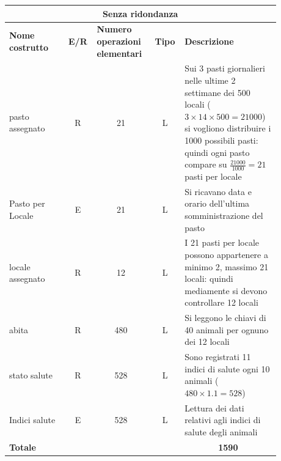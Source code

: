 \documentclass[12pt,a4paper]{article}
\begin{document}
\begin{center}\setlength{\extrarowheight}{1.5pt}\begin{longtable}{|p{0.2\linewidth}|p{0.1\linewidth}|p{0.175\linewidth}|p{0.1\linewidth}|p{0.3\linewidth}|}
\hline
\multicolumn{5}{|c|}{Senza ridondanza}
\\
\hline \textbf{Nome costrutto}   & \multicolumn{1}{|c|}{\textbf{E/R}} & \textbf{Numero operazioni elementari} & \multicolumn{1}{|c|}{\textbf{Tipo}} & \textbf{Descrizione}\\ 
\hline
pasto assegnato
 & 
\multicolumn{1}{|c|}{R}
 & 
\multicolumn{1}{|c|}{21}
 & 
\multicolumn{1}{|c|}{L}
 & 
Sui 3 pasti giornalieri nelle ultime 2 settimane dei 500 locali ($3\times 14 \times 500= 21000$) si vogliono distribuire i 1000 possibili pasti: quindi ogni pasto compare su $\frac{21000}{1000}=21$ pasti per locale
\\
\hline
Pasto per Locale
 & 
\multicolumn{1}{|c|}{E}
 & 
\multicolumn{1}{|c|}{21}
 & 
\multicolumn{1}{|c|}{L}
 & 
Si ricavano data e orario dell'ultima somministrazione del pasto
\\
\hline
locale assegnato
 & 
\multicolumn{1}{|c|}{R}
 & 
\multicolumn{1}{|c|}{12}
 & 
\multicolumn{1}{|c|}{L}
 & 
I 21 pasti per locale possono appartenere a minimo 2, massimo 21 locali: quindi mediamente si devono controllare 12 locali
\\
\hline
abita
 & 
\multicolumn{1}{|c|}{R}
 & 
\multicolumn{1}{|c|}{480}
 & 
\multicolumn{1}{|c|}{L}
 & 
Si leggono le chiavi di 40 animali per ognuno dei 12 locali
\\
\hline
stato salute
 & 
\multicolumn{1}{|c|}{R}
 & 
\multicolumn{1}{|c|}{528}
 & 
\multicolumn{1}{|c|}{L}
 & 
Sono registrati 11 indici di salute ogni 10 animali ($480\times 1.1 = 528$)
\\
\hline
Indici salute
 & 
\multicolumn{1}{|c|}{E}
 & 
\multicolumn{1}{|c|}{528}
 & 
\multicolumn{1}{|c|}{L}
 & 
Lettura dei dati relativi agli indici di salute degli animali
\\
\hline
\multicolumn{4}{|l|}{\textbf{Totale}}
 & 
\multicolumn{1}{|c|}{\textbf{1590}}
\\
\hline
\end{longtable}\end{center}
\end{document}
